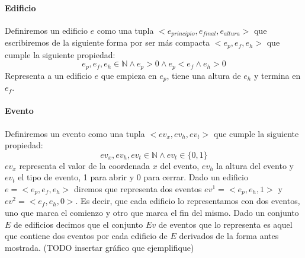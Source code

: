 \paragraph{Edificio}
Definiremos un edificio $e$ como una tupla $<e_{principio}, e_{final}, e_{altura}>$ que escribiremos de la siguiente forma por ser más compacta $<e_p, e_f, e_h>$ que cumple la siguiente propiedad:
\begin{displaymath}
	e_p, e_f, e_h \in \mathbb{N} \land e_p > 0 \land e_p < e_f \land e_h > 0
\end{displaymath}
Representa a un edificio $e$ que empieza en $e_p$, tiene una altura de $e_h$ y termina en $e_f$.

\paragraph{Evento}
Definiremos un evento como una tupla $<ev_x, ev_h, ev_t>$ que cumple la siguiente propiedad:
\begin{displaymath}
	ev_x, ev_h, ev_t \in \mathbb{N} \land ev_t \in \{ 0, 1\}
\end{displaymath}
$ev_x$ representa el valor de la coordenada $x$ del evento, $ev_h$ la altura del evento y $ev_t$ el tipo de 
evento, 1 para abrir y 0 para cerrar.
Dado un edificio $e = <e_p, e_f, e_h>$  diremos que representa dos eventos $ev^1 = <e_p, e_h, 1>$ y $ev^2 = <e_f, e_h, 0>$.
Es decir, que cada edificio lo representamos con dos eventos, uno que marca el comienzo y otro que marca el fin del mismo. 
Dado un conjunto $E$ de edificios decimos que el conjunto $Ev$ de eventos que lo representa es aquel que contiene dos eventos
por cada edificio de $E$ derivados de la forma antes mostrada.
(TODO insertar gráfico que ejemplifique)

